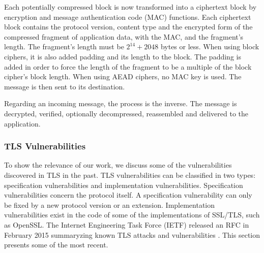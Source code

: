\documentclass{sig-alternate-05-2015}
\begin{document}
Each potentially compressed block is now transformed into a ciphertext block by encryption and message authentication code (MAC) functions. Each ciphertext block contains the protocol version, content type and the encrypted form of the compressed fragment of application data, with the MAC, and the fragment's length.  The fragment's length must be $2^{14} + 2048$ bytes or less. When using block ciphers, it is also added  padding and its length to the block. The padding is added in order to force the length of the fragment to be a multiple of the block cipher's block length. When using AEAD ciphers, no MAC key is used.
The message is then sent to its destination.

Regarding an incoming message, the process is the inverse. The message is decrypted, verified, optionally decompressed, reassembled and delivered to the application.

\subsubsection{TLS Vulnerabilities}
\label{tls-vulnerabilities}

To show the relevance of our work, we discuss some of the vulnerabilities discovered in TLS in the past.
TLS vulnerabilities can be classified in two types: specification vulnerabilities and implementation vulnerabilities. Specification vulnerabilities concern the protocol itself. A specification vulnerability can only be fixed by a new protocol version or an extension. 
Implementation vulnerabilities exist in the code of some of the  implementations of SSL/TLS, such as OpenSSL.
The Internet Engineering Task Force (IETF) released an RFC in February 2015 summaryzing known TLS attacks and vulnerabilities  \cite{RFC7457}. This section  presents some of the most recent.
\end{document}
